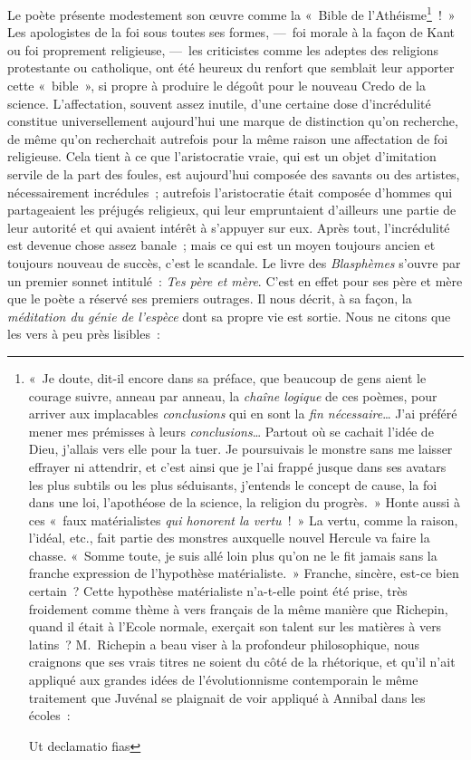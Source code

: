 \documentclass[french,twoside]{book} %
\begin{document}
\noindent Le poète présente modestement son œuvre comme la « Bible de l’Athéisme\footnote{\noindent « Je doute, dit-il encore dans sa préface, que beaucoup de gens aient le courage suivre, anneau par anneau, la \emph{chaîne logique} de ces poèmes, pour arriver aux implacables \emph{conclusions} qui en sont la \emph{fin nécessaire}… J’ai préféré mener mes prémisses à leurs \emph{conclusions}… Partout où se cachait l’idée de Dieu, j’allais vers elle pour la tuer. Je poursuivais le monstre sans me laisser effrayer ni attendrir, et c’est ainsi que je l’ai frappé jusque dans ses avatars les plus subtils ou les plus séduisants, j’entends le concept de cause, la foi dans une loi, l’apothéose de la science, la religion du progrès. » Honte aussi à ces « faux matérialistes \emph{qui honorent la vertu} ! » La vertu, comme la raison, l’idéal, etc., fait partie des monstres auxquelle nouvel Hercule va faire la chasse. « Somme toute, je suis allé loin plus qu’on ne le fit jamais sans la franche expression de l’hypothèse matérialiste. » Franche, sincère, est-ce bien certain ? Cette hypothèse matérialiste n’a-t-elle point été prise, très froidement comme thème à vers français de la même manière que Richepin, quand il était à l’Ecole normale, exerçait son talent sur les matières à vers latins ? M. Richepin a beau viser à la profondeur philosophique, nous craignons que ses vrais titres ne soient du côté de la rhétorique, et qu’il n’ait appliqué aux grandes idées de l’évolutionnisme contemporain le même traitement que Juvénal se plaignait de voir appliqué à Annibal dans les écoles :\par
\noindent Ut declamatio fias
} ! » Les apologistes de la foi sous toutes ses formes, — foi morale à la façon de Kant ou foi proprement religieuse, — les criticistes comme les adeptes des religions protestante ou catholique, ont été heureux du renfort que semblait leur apporter cette « bible », si propre à produire le dégoût pour le nouveau Credo de la science. L’affectation, souvent assez inutile, d’une certaine dose d’incrédulité constitue universellement aujourd’hui une marque de distinction qu’on recherche, de même qu’on recherchait autrefois pour la même raison une affectation de foi religieuse. Cela tient à ce que l’aristocratie vraie, qui est un objet d’imitation servile de la part des foules, est aujourd’hui composée des savants ou des artistes, nécessairement incrédules ; autrefois l’aristocratie était composée d’hommes qui partageaient les préjugés religieux, qui leur empruntaient d’ailleurs une partie de leur autorité et qui avaient intérêt à s’appuyer sur eux. Après tout, l’incrédulité est devenue chose assez banale ; mais ce qui est un moyen toujours ancien et toujours nouveau de succès, c’est le scandale. Le livre des \emph{Blasphèmes} s’ouvre par un premier sonnet intitulé : \emph{Tes père et mère}. C’est en effet pour ses père et mère que le poète a réservé ses premiers outrages. Il nous décrit, à sa façon, la \emph{méditation du génie de l’espèce} dont sa propre vie est sortie. Nous ne citons que les vers à peu près lisibles :\par
\end{document}
